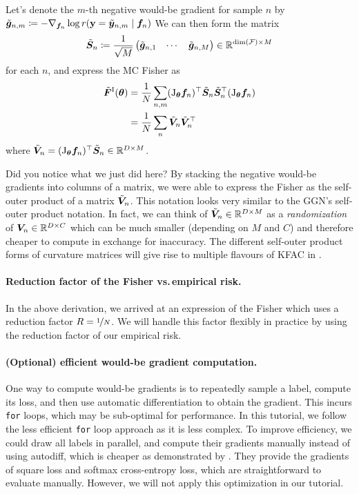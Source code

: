 Let's denote the $m$-th negative would-be gradient for sample $n$ by $\tilde{{\bm{g}}}_{n,m} \coloneq -\nabla_{{\bm{f}}_n} \log r({\mathbf{y}} = \tilde{{\bm{y}}}_{n,m} \mid {\bm{f}}_n)$
We can then form the matrix
\begin{align*}
  \tilde{{\bm{S}}}_n
  \coloneq
  \frac{1}{\sqrt{M}}
  \begin{pmatrix}
    \tilde{{\bm{g}}}_{n,1} & \cdots & \tilde{{\bm{g}}}_{n,M}
  \end{pmatrix}
  \in {\mathbb{R}}^{\dim({\mathcal{F}}) \times M}
\end{align*}
for each $n$, and express the MC Fisher as
\begin{align*}
  \tilde{{\bm{F}}}^{\text{I}}({\bm{\theta}})
  & =
    \frac{1}{N} \sum_{n,m}
    (\mathrm{J}_{{\bm{\theta}}}{\bm{f}}_n)^{\top}
    \tilde{{\bm{S}}}_n
    \tilde{{\bm{S}}}_n^{\top}
    (\mathrm{J}_{{\bm{\theta}}}{\bm{f}}_n)
  \\
  & =
    \frac{1}{N} \sum_n
    \tilde{{\bm{V}}}_n
    \tilde{{\bm{V}}}_n^{\top}
\end{align*}
where $\tilde{{\bm{V}}}_n = (\mathrm{J}_{{\bm{\theta}}}{\bm{f}}_n)^{\top} \tilde{{\bm{S}}}_n \in {\mathbb{R}}^{D \times M}$.

Did you notice what we just did here?
By stacking the negative would-be gradients into columns of a matrix, we were able to express the Fisher as the self-outer product of a matrix $\tilde{{\bm{V}}}_n$.
This notation looks very similar to the GGN's self-outer product notation.
In fact, we can think of $\tilde{{\bm{V}}}_n \in {\mathbb{R}}^{D \times M}$ as a \emph{randomization} of ${\bm{V}}_n \in {\mathbb{R}}^{D \times C}$ which can be much smaller (depending on $M$ and $C$) and therefore cheaper to compute in exchange for inaccuracy.
The different self-outer product forms of curvature matrices will give rise to multiple flavours of KFAC in .

\paragraph{Reduction factor of the Fisher vs.\,empirical risk.}
In the above derivation, we arrived at an expression of the Fisher which uses a reduction factor $R = \nicefrac{1}{N}$.
We will handle this factor flexibly in practice by using the reduction factor of our empirical risk.

\paragraph{(Optional) efficient would-be gradient computation.}
One way to compute would-be gradients is to repeatedly sample a label, compute its loss, and then use automatic differentiation to obtain the gradient.
This incurs \texttt{for} loops, which may be sub-optimal for performance.
In this tutorial, we follow the less efficient \texttt{for} loop approach as it is less complex.
To improve efficiency, we could draw all labels in parallel, and compute their gradients manually instead of using autodiff, which is cheaper as demonstrated by .
They provide the gradients of square loss and softmax cross-entropy loss, which are straightforward to evaluate manually.
However, we will not apply this optimization in our tutorial.

